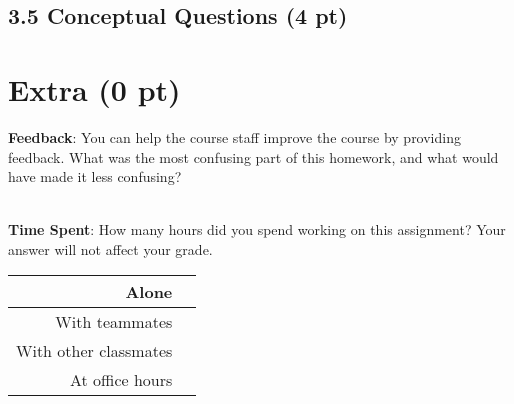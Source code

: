 \documentclass[12pt]{article}
\begin{document}
\subsection*{3.5 Conceptual Questions (4 pt)}

\begin{tcolorbox}[fit,height=22em, width=40em, blank, borderline={1pt}{1pt},nobeforeafter]
\begin{center}

\end{center}
\end{tcolorbox}

\section*{Extra (0 pt)}

\textbf{Feedback}: You can help the course staff improve the course by providing feedback. What was the most confusing part of this homework, and what would have made it less confusing?

\begin{tcolorbox}[fit,height=10em, width=40em, blank, borderline={1pt}{1pt},nobeforeafter]
            \begin{center}
            \end{center}
            \end{tcolorbox}\\

\noindent\textbf{Time Spent}: How many hours did you spend working on this assignment? Your answer will not affect your grade.

\begin{tcolorbox}[fit,height=8em, width=40em, blank, borderline={1pt}{1pt},nobeforeafter]
\begin{table}[H]
    \centering
    \begin{tabular}{r|c}
        Alone &  \hspace{3em}  %
        \\ \hline
        With teammates & \hspace{3em}  %
        \\ \hline
        With other classmates & \hspace{3em}  %
        \\ \hline
        At office hours & \hspace{3em}  %
        \\ \hline
    \end{tabular}
        
\end{table}
\end{tcolorbox}
\end{document}
